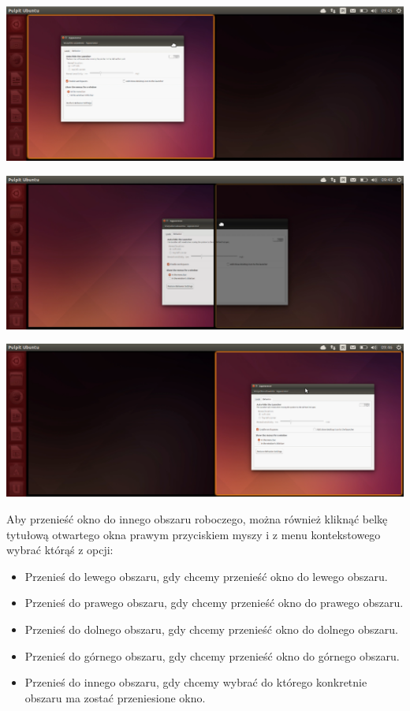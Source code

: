 \begin{center}
	\includegraphics[width=\linewidth]{images/unity_okno_przenoszenie1.png}
\end{center}
\vspace{0.2cm}
\begin{center}
	\includegraphics[width=\linewidth]{images/unity_okno_przenoszenie2.png}
\end{center}
\vspace{0.2cm}
\begin{center}
	\includegraphics[width=\linewidth]{images/unity_okno_przenoszenie3.png}
\end{center}
\clearpage
Aby przenieść okno do innego obszaru roboczego, można również kliknąć belkę tytułową otwartego okna prawym przyciskiem myszy i z menu kontekstowego wybrać którąś z opcji:
\begin{itemize}
\item \textcolor{ubuntu_orange}{Przenieś do lewego obszaru}, gdy chcemy przenieść okno do lewego obszaru.
\item \textcolor{ubuntu_orange}{Przenieś do prawego obszaru}, gdy chcemy przenieść okno do prawego obszaru.
\item \textcolor{ubuntu_orange}{Przenieś do dolnego obszaru}, gdy chcemy przenieść okno do dolnego obszaru.
\item \textcolor{ubuntu_orange}{Przenieś do górnego obszaru}, gdy chcemy przenieść okno do górnego obszaru.
\item \textcolor{ubuntu_orange}{Przenieś do innego obszaru}, gdy chcemy wybrać do którego konkretnie obszaru ma zostać przeniesione okno.
\end{itemize}

